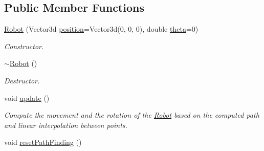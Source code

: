 \subsection*{Public Member Functions}
\begin{DoxyCompactItemize}
\item 
\hyperlink{classRobot_a02cded1ec8e6c536a2e07a44d45b3551}{Robot} (Vector3d \hyperlink{classLocalizedObject_a340834deefc9e5c39da1f26c4ebf4f8c}{position}=Vector3d(0, 0, 0), double \hyperlink{classLocalizedObject_aa5f7b070b6dc97a64a90797a0bca56e2}{theta}=0)
\begin{DoxyCompactList}\small\item\em Constructor. \end{DoxyCompactList}\item 
\hyperlink{classRobot_a924320124b09c2f2ac1621aa210d5f38}{$\sim$\+Robot} ()
\begin{DoxyCompactList}\small\item\em Destructor. \end{DoxyCompactList}\item 
void \hyperlink{classRobot_adc34eec22821c2dce23904a5ea75cf13}{update} ()\hypertarget{classRobot_adc34eec22821c2dce23904a5ea75cf13}{}\label{classRobot_adc34eec22821c2dce23904a5ea75cf13}

\begin{DoxyCompactList}\small\item\em Compute the movement and the rotation of the \hyperlink{classRobot}{Robot} based on the computed path and linear interpolation between points. \end{DoxyCompactList}\item 
void \hyperlink{classRobot_a2a169125261257a4900c546c6b9a02b0}{reset\+Path\+Finding} ()\hypertarget{classRobot_a2a169125261257a4900c546c6b9a02b0}{}\label{classRobot_a2a169125261257a4900c546c6b9a02b0}


\end{DoxyCompactItemize}
